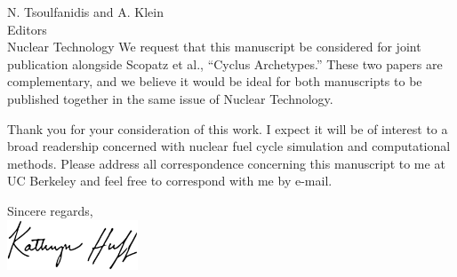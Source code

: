 \documentclass[10pt]{letter} %
\begin{document}
\begin{letter}{N. Tsoulfanidis and A. Klein\\
Editors\\
Nuclear Technology}
We request that this manuscript be considered for joint publication alongside
Scopatz et al., ``Cyclus Archetypes.'' These two papers are complementary, and we
believe it would be ideal for both manuscripts to be published together in the
same issue of Nuclear Technology.

Thank you for your consideration of this work. I expect it will be of interest
to a broad readership concerned with nuclear fuel cycle simulation and
computational methods. Please address all correspondence concerning this
manuscript to me at UC Berkeley and feel free to correspond with me by e-mail.

\closing{Sincere regards,%
\\
\vspace{-20mm}\includegraphics[height=1.5cm]{signature.eps}
}

\end{letter}
\end{document}
